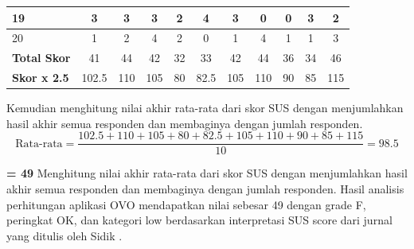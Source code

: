 \documentclass[
 manuscript=article,  %
  layout=publish, 
  year=2024, 
  month= Februari, %
  volume=8,
  number=1 
]{JIKO}
\begin{document}
\begin{table}[hbt!]
\begin{threeparttable}
\begin{tabular}{l*{10}{c}}
            \hline
            19 & 3 & 3 & 3 & 2 & 4 & 3 & 0 & 0 & 3 & 2 \\
            \hline
            20 & 1 & 2 & 4 & 2 & 0 & 1 & 4 & 1 & 1 & 3 \\
            \midrule
            \textbf{Total Skor}   & 41 & 44 & 42 & 32 & 33 & 42 & 44 & 36 & 34 & 46 \\
            \hline
            \textbf{Skor x 2.5}   & 102.5 & 110 & 105 & 80 & 82.5 & 105 & 110 & 90 & 85 & 115 \\
            \bottomrule
        \end{tabular}
    \end{threeparttable}
\end{table}

Kemudian menghitung nilai akhir rata-rata dari skor SUS dengan menjumlahkan hasil akhir semua responden dan membaginya dengan jumlah responden.
\[
\text{Rata-rata} = \frac{102.5 + 110 + 105 + 80 + 82.5 + 105 + 110 + 90 + 85 + 115}{10} = 98.5
\]

\textbf{= 49}
Menghitung nilai akhir rata-rata dari skor SUS dengan menjumlahkan hasil akhir semua responden dan membaginya dengan jumlah responden. Hasil analisis perhitungan aplikasi OVO mendapatkan nilai sebesar 49 dengan grade F, peringkat OK, dan kategori low berdasarkan interpretasi SUS score dari jurnal yang ditulis oleh Sidik \cite{9}.
\usepackage{float} %
\end{document}
